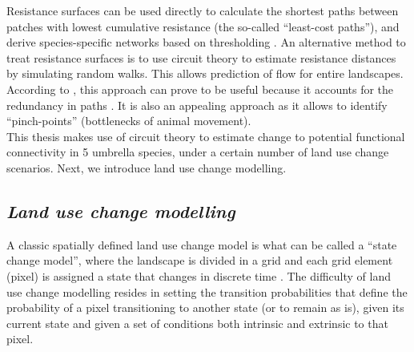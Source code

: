 \documentclass[12pt,Bold,TexShade]{thesis/mcgilletdclass}
\begin{document}
{Resistance surfaces can be used directly to calculate the shortest paths between patches with lowest cumulative resistance (the so-called “least-cost paths”), and derive species-specific networks based on thresholding \citep{lechner_characterising_2017}. An alternative method to treat resistance surfaces is to use circuit theory to estimate resistance distances by simulating random walks. This allows prediction of flow for entire landscapes. According to \cite{fletcher_spatial_2018}, this approach can prove to be useful because it accounts for the redundancy in paths \cite{mcrae_isolation_2006, mcrae_mcrae_2008}. It is also an appealing approach as it allows to identify “pinch-points” (bottlenecks of animal movement). \\

This thesis makes use of circuit theory to estimate change to potential functional connectivity in 5 umbrella species, under a certain number of land use change scenarios. Next, we introduce land use change modelling. \\ \vspace{2em}

\subsection*{\textit{Land use change modelling \\ \vspace{1em}}}

A classic spatially defined land use change model is what can be called a “state change model”, where the landscape is divided in a grid and each grid element (pixel) is assigned a state that changes in discrete time \citep{daniel_state-and-transition_2016}. The difficulty of land use change modelling resides in setting the transition probabilities that define the probability of a pixel transitioning to another state (or to remain as is), given its current state and given a set of conditions both intrinsic and extrinsic to that pixel. \\

}
\end{document}
